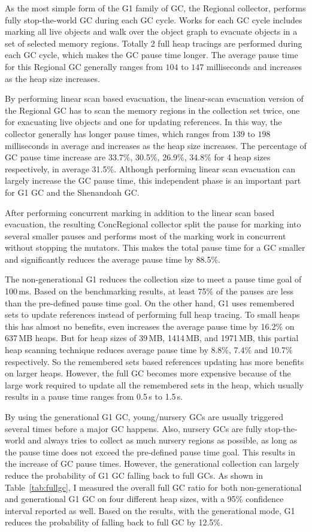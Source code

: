 As the most simple form of the G1 family of GC, the Regional collector, performs fully
stop-the-world GC during each GC cycle. Works for each GC cycle includes marking all
live objects and walk over the object graph to evacuate objects in a set of selected memory
regions. Totally 2 full heap tracings are performed during each GC cycle, which makes the GC
pause time longer. The average pause time for this Regional GC generally ranges from $104$ to $147$
milliseconds and increases as the heap size increases.

By performing linear scan based evacuation, the linear-scan evacuation version of the Regional
GC has to scan the memory regions in the collection set twice, one for exacuating live objects and
one for updating references. In this way, the collector generally has longer pause times,
which ranges from $139$ to $198$ milliseconds in average and increases as the heap size increases.
The percentage of GC pause time increase are 33.7\%, 30.5\%, 26.9\%, 34.8\% for 4 heap sizes
respectively, in average 31.5\%.
Although performing linear scan evacuation can largely increase the GC pause time,
this independent phase is an important part for G1 GC and the Shenandoah GC.

After performing concurrent marking in addition to the linear scan based evacuation,
the resulting ConcRegional collector split the pause for marking into several smaller
pauses and performs most of the marking work in concurrent without stopping the mutators.
This makes the total pause time for a GC smaller and significantly reduces the average
pause time by 88.5\%.

The non-generational G1 reduces the collection size to meet a pause time goal of 100\,ms.
Based on the benchmarking results, at least 75\% of the pauses are less than the pre-defined
pause time goal. On the other hand, G1 uses remembered sets to update references
instead of performing full heap tracing.
To small heaps this has almost no benefits, even increases the average pause time by
16.2\% on 637\,MB heaps. But for heap sizes of 39\,MB, 1414\,MB, and 1971\,MB, this
partial heap scanning technique reduces average pause time by 8.8\%, 7.4\% and 10.7\%
respectively. So the remembered sets based references updating has more benefits on
larger heaps. However, the full GC becomes more expensive because of the large work required
to update all the remembered sets in the heap, which usually results in a pause time
ranges from 0.5\,s to 1.5\,s.

By using the generational G1 GC, young/nursery GCs are usually triggered several times
before a major GC happens. Also, nursery GCs are fully stop-the-world and always tries
to collect as much nursery regions as possible, as long as the pause time does not exceed
the pre-defined pause time goal. This results in the increase of GC pause times.
However, the generational collection can largely reduce the probability of G1 GC falling
back to full GCs. As shown in Table~\ref{tab:fullgc}, I measured the overall full GC ratio
for both non-generational and generational G1 GC on four different heap sizes,
with a 95\% confidence interval reported as well.
Based on the results, with the generational mode, G1 reduces the
probability of falling back to full GC by 12.5\%.


